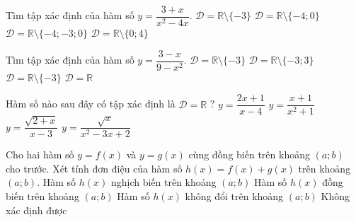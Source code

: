 \begin{ex}%
	Tìm tập xác định của hàm số $y=\dfrac{3+x}{x^2-4x}$.
	\choice
	{$\mathscr{D}=\mathbb{R} \setminus \{-3\}$}
	{$\mathscr{D}=\mathbb{R} \setminus \{-4;0\}$}
	{$\mathscr{D}=\mathbb{R} \setminus \{-4;-3;0\}$}
	{\True $\mathscr{D}=\mathbb{R} \setminus \{0;4\}$}
\end{ex}
\begin{ex}%
	Tìm tập xác định của hàm số $y=\dfrac{3-x}{9-x^2}$.
	\choice
	{$\mathscr{D}=\mathbb{R} \setminus \{-3\}$}
	{\True$\mathscr{D}=\mathbb{R} \setminus \{-3;3\}$}
	{$\mathscr{D}=\mathbb{R} \setminus \{-3\}$}
	{$\mathscr{D}=\mathbb{R} $}
\end{ex}
\begin{ex}%
	Hàm số nào sau đây có tập xác định là {$\mathscr{D}=\mathbb{R}$} ?
	\choice
	{$y=\dfrac{2x+1}{x-4}$}
	{\True $y=\dfrac{x+1}{x^2+1}$}
	{$y=\dfrac{\sqrt{2+x}}{x-3}$}
	{$y=\dfrac{\sqrt{x}}{x^2-3x+2}$}	
\end{ex}
\begin{ex}%
	Cho hai hàm số $y=f(x)$ và $y=g(x)$ cùng đồng biến trên khoảng $\left(a;b\right)$ cho trước. Xét tính đơn điệu của hàm số $h(x)=f(x)+g(x)$ trên khoảng $\left(a;b\right)$.
	\choice
	{Hàm số $h(x)$ nghịch biến trên khoảng $\left(a;b\right)$}
	{\True Hàm số $h(x)$ đồng biến trên khoảng $\left(a;b\right)$}
	{Hàm số $h(x)$ không đổi trên khoảng $\left(a;b\right)$}
	{Không xác định được}
\end{ex}
